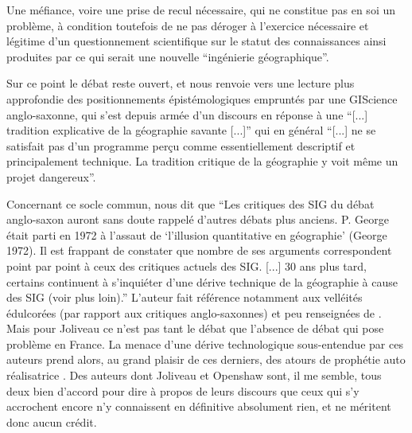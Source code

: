 Une méfiance, voire une prise de recul nécessaire, qui ne constitue pas en soi un problème, à condition toutefois de ne pas déroger à l'exercice nécessaire et légitime d'un questionnement scientifique sur le statut des connaissances ainsi produites par ce qui serait une nouvelle \enquote{ingénierie géographique}.

Sur ce point le débat reste ouvert, et \textcite[474-477]{Joliveau2004} nous renvoie vers une lecture plus approfondie des positionnements épistémologiques empruntés par une GIScience anglo-saxonne, qui s'est depuis armée d'un discours en réponse à une \enquote{[...] tradition explicative de la géographie savante [...]} qui en général \enquote{[...] ne se satisfait pas d'un programme perçu comme essentiellement descriptif et principalement technique. La tradition critique de la géographie y voit même un projet dangereux}.

Concernant ce socle commun, \textcite[477]{Joliveau2004} nous dit que \enquote{Les critiques des SIG du débat anglo-saxon auront sans doute rappelé d'autres débats plus anciens. P. George était parti en 1972 à l'assaut de \enquote{l'illusion quantitative en géographie} (George 1972). Il est frappant de constater que nombre de ses arguments correspondent point par point à ceux des critiques actuels des SIG. [...] 30 ans plus tard, certains continuent à s'inquiéter d'une dérive technique de la géographie à cause des SIG (voir plus loin).} L'auteur fait référence notamment aux velléités édulcorées (par rapport aux critiques anglo-saxonnes) et peu renseignées de \autocite{Staszak2001}. Mais pour Joliveau ce n'est pas tant le débat que l'absence de débat qui pose problème en France. La menace d'une dérive technologique sous-entendue par ces auteurs prend alors, au grand plaisir de ces derniers, des atours de prophétie auto réalisatrice . Des auteurs dont Joliveau  et Openshaw sont, il me semble, tous deux bien d'accord pour dire à propos de leurs discours que ceux qui s'y accrochent encore n'y connaissent en définitive absolument rien, et ne méritent donc aucun crédit.


